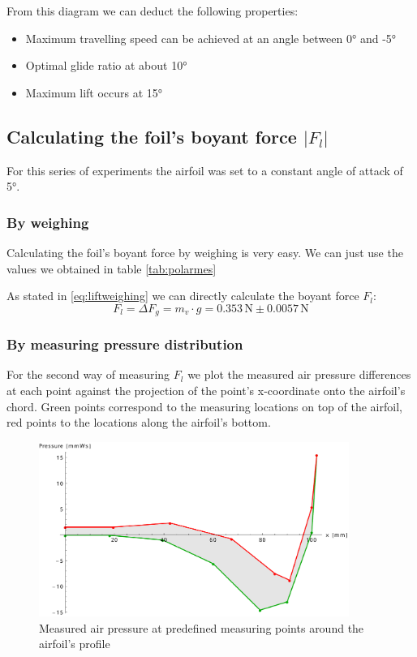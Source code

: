\documentclass{scrreprt}
\newcommand{\unit}[1]{\ensuremath{\, \mathrm{#1}}}
\begin{document}
From this diagram we can deduct the following properties:
\begin{itemize}
\item Maximum travelling speed can be achieved at an angle between \ang{0} and \ang{-5}
\item Optimal glide ratio at about \ang{10}
\item Maximum lift occurs at \ang{15}

\end{itemize}

\subsection{Calculating the foil's boyant force $\lvert F_l\rvert$}
For this series of experiments the airfoil was set to a constant angle of attack of \ang{5}.

\subsubsection{By weighing}
Calculating the foil's boyant force by weighing is very easy. We can just use the values we obtained in table \ref{tab:polarmes}

As stated in \ref{eq:liftweighing} we can directly calculate the boyant force $F_l$:
\begin{equation}
F_l = \Delta F_g = m_v \cdot g = 0.353 \unit{N} \pm 0.0057 \unit{N}
\end{equation}

\subsubsection{By measuring pressure distribution}
For the second way of measuring $F_l$ we plot the measured air pressure differences at each point against the projection of the point's x-coordinate onto the airfoil's chord. Green points correspond to the measuring locations on top of the airfoil, red points to the locations along the airfoil's bottom. 

\begin{figure}[H]
	\centering
  \includegraphics[width=0.9\textwidth]{diag/meas_pressure.pdf}
	\caption{Measured air pressure at predefined measuring points around the airfoil's profile}
	\label{fig:pressure}
\end{figure}
\end{document}
